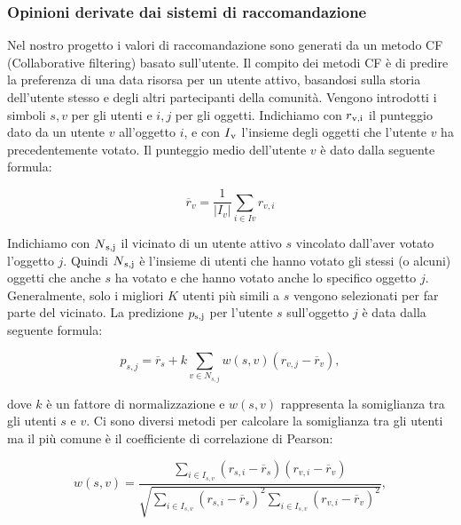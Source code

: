 \documentclass{report}
\begin{document}
	\hypertarget{header-n108}{%
		\subsubsection{Opinioni derivate dai sistemi di
			raccomandazione}\label{header-n108}}
	
	Nel nostro progetto i valori di raccomandazione sono generati da un
	metodo CF (Collaborative filtering) basato sull'utente. Il compito dei
	metodi CF è di predire la preferenza di una data risorsa per un utente
	attivo, basandosi sulla storia dell'utente stesso e degli altri
	partecipanti della comunità. Vengono introdotti i simboli $s,v$ per gli
	utenti e $i,j$ per gli oggetti. Indichiamo con $r\textsubscript{v,i}$ il punteggio dato da
	un utente $v$ all'oggetto $i$, e con $I\textsubscript{v}$ l'insieme degli oggetti che l'utente
	$v$ ha precedentemente votato. Il punteggio medio dell'utente $v$ è dato
	dalla seguente formula:
	
	\begin{center}
	\begin{equation}
		\overline{r}_v=\frac{1}{|I_v|} \sum_{i \in Iv} r_{v,i}
		\label{equazione6}
	\end{equation}
	\end{center}
	
	Indichiamo con $N\textsubscript{s,j}$ il vicinato di un utente attivo $s$ vincolato
	dall'aver votato l'oggetto $j$. Quindi $N\textsubscript{s,j}$ è l'insieme di utenti che
	hanno votato gli stessi (o alcuni) oggetti che anche $s$ ha votato e che
	hanno votato anche lo specifico oggetto $j$. Generalmente, solo i migliori
	$K$ utenti più simili a $s$ vengono selezionati per far parte del vicinato.
	La predizione $p\textsubscript{s,j}$ per l'utente $s$ sull'oggetto $j$ è data dalla seguente
	formula:
	
	\begin{center}
		\begin{equation}
			p_{s,j}=\overline{r}_s+k \sum_{v \in N_{s,j}}w(s,v)(r_{v,j}-\overline{r}_v),
			\label{equazione7}
		\end{equation}
		
	\end{center}
	
	dove $k$ è un fattore di normalizzazione e $w(s,v)$ rappresenta la
	somiglianza tra gli utenti $s$ e $v$. Ci sono diversi metodi per calcolare
	la somiglianza tra gli utenti ma il più comune è il coefficiente di
	correlazione di Pearson:
	
	\begin{center}
		\begin{equation}
			w(s,v)=\frac{\sum_{i \in I_{s,v}}(r_{s,i}-\overline{r}_s)(r_{v,i}-\overline{r}_v)}{\sqrt{\sum_{i \in I_{s,v}} (r_{s,i}-\overline{r}_s)^2 \sum_{i \in I_{s,v}}(r_{v,i}-\overline{r}_v)^2}},
			\label{equazione8}
		\end{equation}
		
	\end{center}
	
\end{document}
